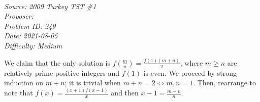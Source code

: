 \SSbreak\\
\emph{Source: 2009 Turkey TST \#1}\\
\emph{Proposer: \Paiya}\\
\emph{Problem ID: 249}\\
\emph{Date: 2021-08-05}\\
\emph{Difficulty: Medium}\\
\SSbreak

\bigskip

\begin{solution}\hfil\medskip
  
    We claim that the only solution is $f\left(\frac{m}{n}\right) = \frac{f(1)(m + n)}{2}$, where $m \geq n$ are 
    relatively prime positive integers and $f(1)$ is even. We proceed by strong induction on $m + n$; 
    it is trivial when $m + n = 2 \iff m, n = 1$. Then, rearrange to note that $f(x) = \frac{(x + 1)f(x - 1)}{x}$ 
    and then $x - 1 = \frac{m - n}{n}$. 
\end{solution}\bigskip
